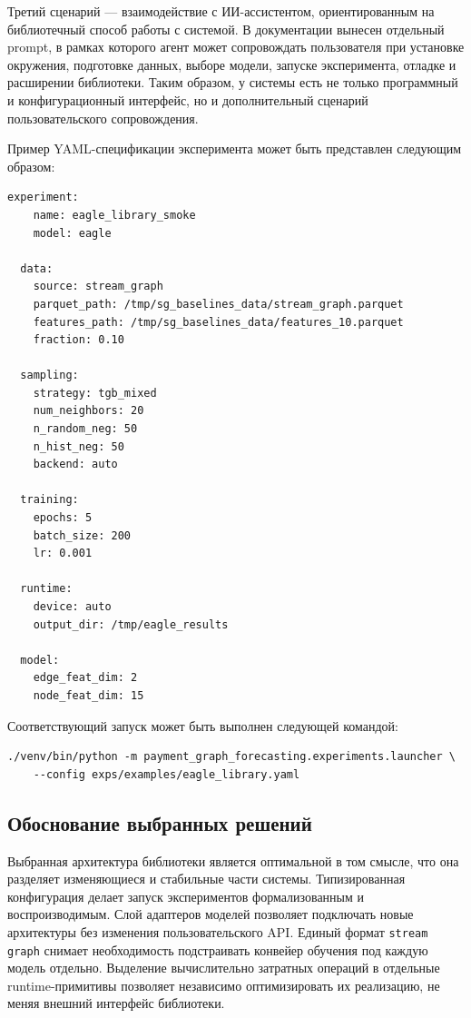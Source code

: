\documentclass[a4paper,12pt]{extarticle}
\begin{document}
  Третий сценарий --- взаимодействие с ИИ-ассистентом, ориентированным на библиотечный способ работы с системой. В документации вынесен отдельный prompt, в рамках
  которого агент может сопровождать пользователя при установке окружения, подготовке данных, выборе модели, запуске эксперимента, отладке и расширении библиотеки.
  Таким образом, у системы есть не только программный и конфигурационный интерфейс, но и дополнительный сценарий пользовательского сопровождения.

  Пример YAML-спецификации эксперимента может быть представлен следующим образом:
  \begin{lstlisting}[basicstyle=\ttfamily\small,frame=single]
  experiment:
    name: eagle_library_smoke
    model: eagle

  data:
    source: stream_graph
    parquet_path: /tmp/sg_baselines_data/stream_graph.parquet
    features_path: /tmp/sg_baselines_data/features_10.parquet
    fraction: 0.10

  sampling:
    strategy: tgb_mixed
    num_neighbors: 20
    n_random_neg: 50
    n_hist_neg: 50
    backend: auto

  training:
    epochs: 5
    batch_size: 200
    lr: 0.001

  runtime:
    device: auto
    output_dir: /tmp/eagle_results

  model:
    edge_feat_dim: 2
    node_feat_dim: 15
  \end{lstlisting}

  Соответствующий запуск может быть выполнен следующей командой:
  \begin{lstlisting}[basicstyle=\ttfamily\small,frame=single]
  ./venv/bin/python -m payment_graph_forecasting.experiments.launcher \
    --config exps/examples/eagle_library.yaml
  \end{lstlisting}

  \subsection{Обоснование выбранных решений}

  Выбранная архитектура библиотеки является оптимальной в том смысле, что она разделяет изменяющиеся и стабильные части системы. Типизированная конфигурация делает
  запуск экспериментов формализованным и воспроизводимым. Слой адаптеров моделей позволяет подключать новые архитектуры без изменения пользовательского API. Единый
  формат \texttt{stream graph} снимает необходимость подстраивать конвейер обучения под каждую модель отдельно. Выделение вычислительно затратных операций в
  отдельные runtime-примитивы позволяет независимо оптимизировать их реализацию, не меняя внешний интерфейс библиотеки.
\end{document}
